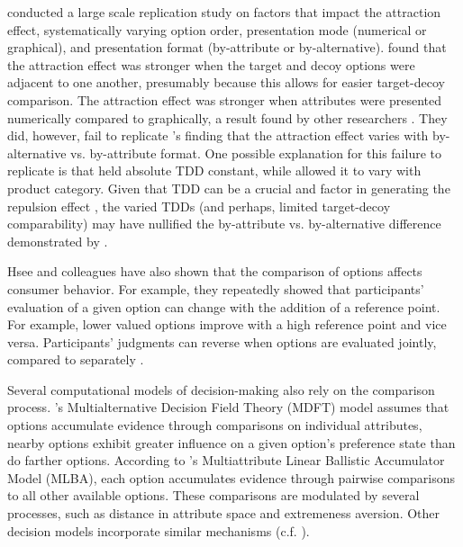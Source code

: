 \textcite{hasan2025registered} conducted a large scale replication study on factors that impact the attraction effect, systematically varying option order, presentation mode (numerical or graphical), and presentation format (by-attribute or by-alternative). \textcite{hasan2025registered} found that the attraction effect was stronger when the target and decoy options were adjacent to one another, presumably because this allows for easier target-decoy comparison. The attraction effect was stronger when attributes were presented numerically compared to graphically, a result found by other researchers \parencite{frederickLimitsAttraction2014b,yangMoreEvidenceChallenging2014}. They did, however, fail to replicate \textcite{cataldoComparisonProcessAccount2019b}'s finding that the attraction effect varies with by-alternative vs. by-attribute format. One possible explanation for this failure to replicate is that \textcite{cataldoFramingContextEffects2020} held absolute TDD constant, while \textcite{hasan2025registered} allowed it to vary with product category. Given that TDD can be a crucial and factor in generating the repulsion effect \textcite{spektorWhenGoodLooks2018b,liaoInfluenceDistanceDecoy2021}, the varied TDDs (and perhaps, limited target-decoy comparability) may have nullified the by-attribute vs. by-alternative difference demonstrated by \textcite{cataldoComparisonProcessAccount2019b}.

Hsee and colleagues \parencite{hseeEvaluabilityHypothesisExplanation1996,hseeLessBetterWhen1998,hseeWillProductsLook1998,hsee1999preference} have also shown that the comparison of options affects consumer behavior. For example, they repeatedly showed that participants’ evaluation of a given option can change with the addition of a reference point. For example, lower valued options improve with a high reference point and vice versa. Participants’ judgments can reverse when options are evaluated jointly, compared to separately \parencite{hsee1999preference}. 

Several computational models of decision-making also rely on the comparison process.  \textcite{roeMultialternativeDecisionField2001a}'s Multialternative Decision Field Theory (MDFT) model assumes that options accumulate evidence through comparisons on individual attributes, nearby options exhibit greater influence on a given option's preference state than do farther options. According to \textcite{trueblood2014multiattribute}'s Multiattribute Linear Ballistic Accumulator Model (MLBA), each option accumulates evidence through pairwise comparisons to all other available options. These comparisons are modulated by several processes, such as distance in attribute space and extremeness aversion. Other decision models incorporate similar mechanisms \parencite{usherLossAversionInhibition2004a,noguchiMultialternativeDecisionSampling2018a,spektor2019similarity,wollschlager2NaryChoiceTree2012a,landry2021pairwise} (c.f. \textcite{bhatiaAssociationsAccumulationPreference2013b,bergnerVAMPVotingAgent2019b}). 

